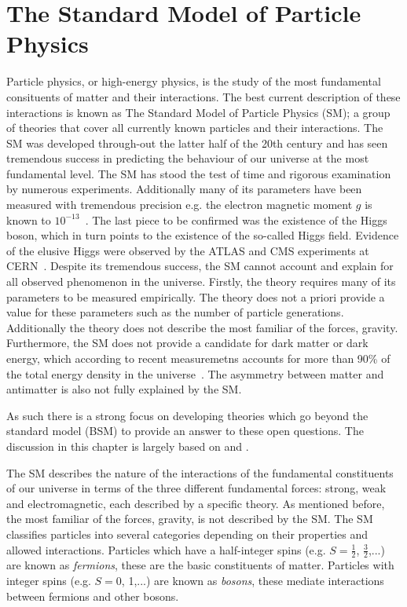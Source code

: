 \chapter{The Standard Model of Particle Physics} \label{sec:the_standard_model_of_particle_physics}
Particle physics, or high-energy physics, is the study of the most fundamental consituents of matter and their interactions. The best current description of these interactions is known as The Standard Model of Particle Physics (SM); a group of theories that cover all currently known particles and their interactions. The SM was developed through-out the latter half of the 20th century and has seen tremendous success in predicting the behaviour of our universe at the most fundamental level. The SM has stood the test of time and rigorous examination by numerous experiments. Additionally many of its parameters have been measured with tremendous precision e.g. the electron magnetic moment $g$ is known to $10^{-13}$~\cite{Theory:AwesomeSM}. The last piece to be confirmed was the existence of the Higgs boson, which in turn points to the existence of the so-called Higgs field. Evidence of the elusive Higgs were observed by the ATLAS and CMS experiments at CERN~\cite{Theory:HiggsDiscoveryATLAS,Theory:HiggsDiscoveryCMS}.
Despite its tremendous success, the SM cannot account and explain for all observed phenomenon in the universe. Firstly, the theory requires many of its parameters to be measured empirically. The theory does not a priori provide a value for these parameters such as the number of particle generations. Additionally the theory does not describe the most familiar of the forces, gravity. Furthermore, the SM does not provide a candidate for dark matter or dark energy, which according to recent measuremetns accounts for more than 90\% of the total energy density in the universe~\cite{Theory:DarkMatter}. The asymmetry between matter and antimatter is also not fully explained by the SM.
%

%
As such there is a strong focus on developing theories which go beyond the standard model (BSM) to provide an answer to these open questions. The discussion in this chapter is largely based on \cite{Theory:Perkins} and \cite{Theory:IntroGriffiths}.

The SM describes the nature of the interactions of the fundamental constituents of our universe in terms of the three different fundamental forces: strong, weak and electromagnetic, each described by a specific theory. As mentioned before, the most familiar of the forces, gravity, is not described by the SM. The SM classifies particles into several categories depending on their properties and allowed interactions. Particles which have a half-integer spins (e.g. $S=\frac{1}{2}$, $\frac{3}{2}$,...) are known as \textit{fermions}, these are the basic constituents of matter. Particles with integer spins (e.g. $S=$0, 1,...) are known as \textit{bosons}, these mediate interactions between fermions and other bosons.

